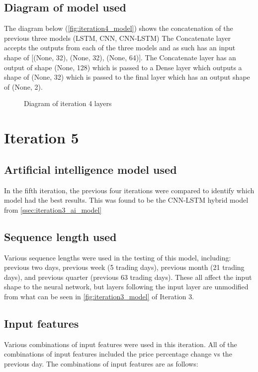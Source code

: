 \subsection{Diagram of model used}
The diagram below (\autoref{fig:iteration4_model}) shows the concatenation of the previous three models (LSTM, CNN, CNN-LSTM)
The Concatenate layer accepts the outputs from each of the three models and as such has an input shape of
{[(None, 32), (None, 32), (None, 64)]}. The Concatenate layer has an output of shape (None, 128) which is passed to a Dense
layer which outputs a shape of (None, 32) which is passed to the final layer which has an output shape of (None, 2).
\begin{figure}[p]
    \centering
    \caption[Diagram of iteration 4 layers]{Diagram of iteration 4 layers}
    \label{fig:iteration4_model}
\end{figure}
\FloatBarrier

\section{Iteration 5}
\subsection{Artificial intelligence model used}\label{ssec:iteration5_ai_model}
In the fifth iteration, the previous four iterations were compared to identify which model had the best results.
This was found to be the CNN-LSTM hybrid model from \autoref{ssec:iteration3_ai_model}

\subsection{Sequence length used}
Various sequence lengths were used in the testing of this model, including: previous two days,
previous week (5 trading days), previous month (21 trading days), and previous quarter (previous 63 trading days).
These all affect the input shape to the neural network, but layers following the input layer are unmodified from
what can be seen in \autoref{fig:iteration3_model} of Iteration 3.

\subsection{Input features}
Various combinations of input features were used in this iteration. All of the combinations of input features included the
price percentage change vs the previous day. The combinations of input features are as follows:

